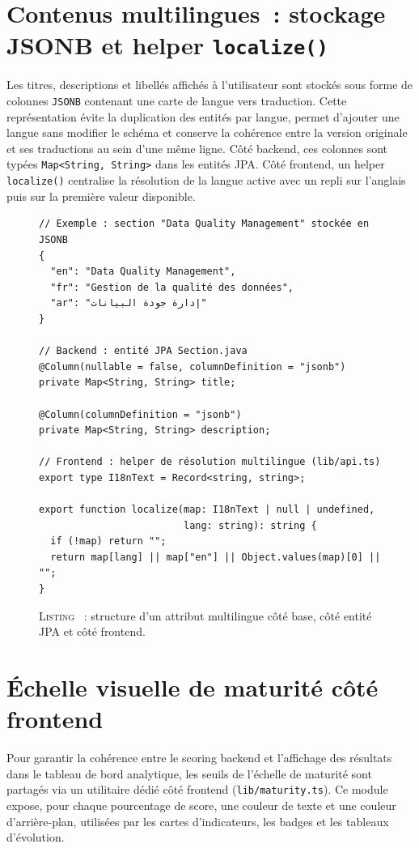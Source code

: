\documentclass[12pt,a4paper]{report}
\begin{document}
\section{Contenus multilingues~: stockage JSONB et helper \texttt{localize()}}
Les titres, descriptions et libellés affichés à l'utilisateur sont stockés sous forme de colonnes \texttt{JSONB} contenant une carte de langue vers traduction. Cette représentation évite la duplication des entités par langue, permet d'ajouter une langue sans modifier le schéma et conserve la cohérence entre la version originale et ses traductions au sein d'une même ligne. Côté backend, ces colonnes sont typées \texttt{Map<String, String>} dans les entités JPA. Côté frontend, un helper \texttt{localize()} centralise la résolution de la langue active avec un repli sur l'anglais puis sur la première valeur disponible.

\begin{figure}[H]
\centering
\begin{minipage}{0.95\textwidth}
\begin{verbatim}
// Exemple : section "Data Quality Management" stockée en JSONB
{
  "en": "Data Quality Management",
  "fr": "Gestion de la qualité des données",
  "ar": "إدارة جودة البيانات"
}

// Backend : entité JPA Section.java
@Column(nullable = false, columnDefinition = "jsonb")
private Map<String, String> title;

@Column(columnDefinition = "jsonb")
private Map<String, String> description;

// Frontend : helper de résolution multilingue (lib/api.ts)
export type I18nText = Record<string, string>;

export function localize(map: I18nText | null | undefined,
                         lang: string): string {
  if (!map) return "";
  return map[lang] || map["en"] || Object.values(map)[0] || "";
}
\end{verbatim}
\end{minipage}
\label{lst:i18n}
\caption*{\textsc{Listing \thefigure}~: structure d'un attribut multilingue côté base, côté entité JPA et côté frontend.}
\end{figure}

\section{Échelle visuelle de maturité côté frontend}
Pour garantir la cohérence entre le scoring backend et l'affichage des résultats dans le tableau de bord analytique, les seuils de l'échelle de maturité sont partagés via un utilitaire dédié côté frontend (\texttt{lib/maturity.ts}). Ce module expose, pour chaque pourcentage de score, une couleur de texte et une couleur d'arrière-plan, utilisées par les cartes d'indicateurs, les badges et les tableaux d'évolution.
\end{document}

